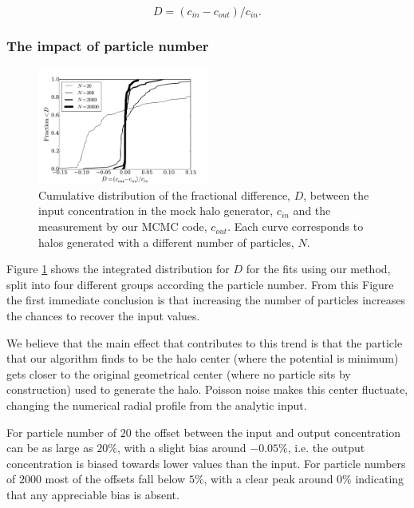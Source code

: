 \documentclass[useAMS,usenatbib]{mn2e}
\begin{document}
\begin{equation}
D=(c_{in}-c_{out})/c_{in}.
\label{eq:D}
\end{equation}

\subsubsection{The impact of particle number}

\begin{figure}
\begin{center}
  \includegraphics[width=0.50\textwidth]{percentual_diff.pdf}
\end{center}
\caption{Cumulative distribution of the fractional difference, $D$, between
  the input concentration in the mock halo generator, $c_{in}$ and the
  measurement by our MCMC code, $c_{out}$. Each curve corresponds to
  halos generated with a different number of particles, $N$.
    \label{fig:results_mocks}}
\end{figure}

Figure \ref{fig:results_mocks} shows the integrated distribution for
$D$ for the fits using our method, split into four different groups
according the particle number.
From this Figure the first immediate
conclusion is that increasing the number of particles increases the
chances to recover the input values.

We believe that the main effect that contributes to this trend
is that the particle that our algorithm finds to be the halo center
(where the potential is minimum) gets closer to the original
geometrical center (where no particle sits by construction) used to
generate the halo.  Poisson noise makes this center fluctuate,
changing the numerical radial profile from the analytic input.

For particle number of $20$ the offset between the input and output
concentration can be as large as $20\%$, with a slight bias around
$-0.05\%$, i.e. the output concentration is biased towards lower
values than the input.
For particle numbers of $2000$ most of the offsets fall below $5\%$,
with a clear peak around $0\%$ indicating that any appreciable bias is
absent.
\end{document}

